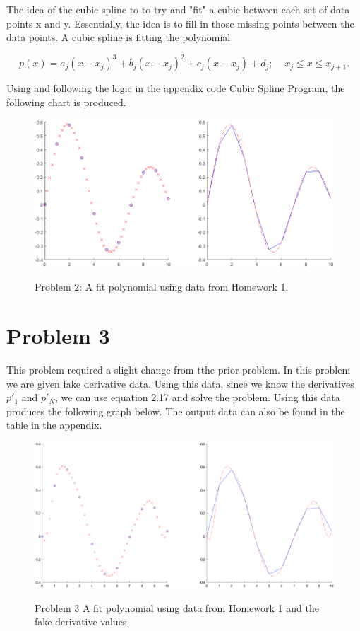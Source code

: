 \documentclass[12pt]{article}
\begin{document}
The idea of the cubic spline to to try and "fit" a cubic between each set of data points x and y. Essentially, the idea is to fill in those missing points between the data points. A cubic spline is fitting the polynomial

$$
p(x) = a_{j}(x - x_{j})^{3} + b_{j}(x - x_{j})^{2} + c_{j}(x - x_{j}) + d_{j}; \;\;\;\; x_{j} \leq x \leq x_{j + 1}.
$$

Using and following the logic in the appendix code Cubic Spline Program, the following chart is produced. 

\begin{figure}[h!]
    \centering
    {{\includegraphics[width=15cm]{figure1.png}}}%
    \qquad
    \caption{Problem 2: A fit polynomial using data from Homework 1. }%
    \label{fig:example}%
\end{figure}


\section*{Problem 3}

This problem required a slight change from tthe prior problem. In this problem we are given fake derivative data. Using this data, since we know the derivatives $p'_{1}$ and $p'_{N}$, we can use equation 2.17 and solve the problem. Using this data produces the following graph below. The output data can also be found in the table in the appendix.

\begin{figure}[h!]
    \centering
    {{\includegraphics[width=15cm]{figure2.png}}}%
    \qquad
    \caption{Problem 3 A fit polynomial using data from Homework 1 and the fake derivative values.}%
    \label{fig:example}%
\end{figure}
\end{document}
